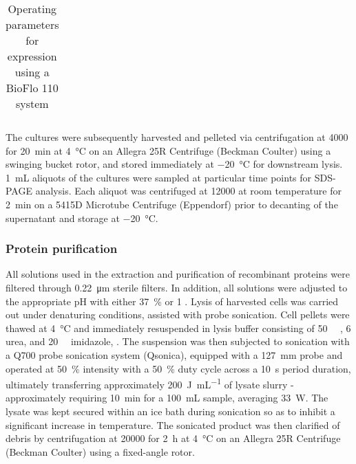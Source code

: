 \begin{refsection}
\begin{table}[h!]
\begin{tabular}{ ll }
  \hline
\end{tabular}
\caption{Operating parameters for expression using a BioFlo 110 system}
\label{tab:bioreactor_parameters}
\end{table}
The cultures were subsequently harvested and pelleted via centrifugation at
\SI{4000}{\gforce} for \SI{20}{\minute} at \SI{4}{\celsius} on an Allegra 25R
Centrifuge (Beckman Coulter) using a swinging bucket rotor, and stored
immediately at \SI{-20}{\celsius} for downstream lysis. \SI{1}{\mL} aliquots of
the cultures were sampled at particular time points for SDS-PAGE analysis. Each
aliquot was centrifuged at \SI{12000}{\rpm} at room temperature for
\SI{2}{\minute} on a 5415D Microtube Centrifuge (Eppendorf) prior to decanting
of the supernatant and storage at \SI{-20}{\celsius}.

\subsubsection{Protein purification}
All solutions used in the extraction and purification of recombinant proteins
were filtered through \SI{0.22}{\um} sterile filters. In addition, all solutions
were adjusted to the appropriate pH with either \SI{37}{\percent}  or
\SI{1}{\moLar} . Lysis of harvested cells was carried out under
denaturing conditions, assisted with probe sonication. Cell pellets were thawed
at \SI{4}{\celsius} and immediately resuspended in lysis buffer consisting of
\SI{50}{\milli\moLar} , \SI{6}{\moLar} urea, and
\SI{20}{\milli\moLar} imidazole, . The suspension was then subjected to
sonication with a Q700 probe sonication system (Qsonica), equipped with a
\SI{127}{\mm} probe and operated at \SI{50}{\percent} intensity with a
\SI{50}{\percent} duty cycle across a \SI{10}{\second} period duration,
ultimately transferring approximately \SI{200}{\joule\per\mL} of lysate slurry -
approximately requiring \SI{10}{\minute} for a \SI{100}{\mL} sample, averaging
\SI{33}{\watt}. The lysate was kept secured within an ice bath during sonication
so as to inhibit a significant increase in temperature. The sonicated product
was then clarified of debris by centrifugation at \SI{20000}{\gforce} for
\SI{2}{\hour} at \SI{4}{\celsius} on an Allegra 25R Centrifuge (Beckman Coulter)
using a fixed-angle rotor.


\end{refsection}
